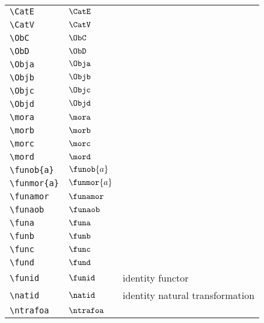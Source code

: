 \begin{longtable}{lll}
 {\color[rgb]{0.5,0.5,0.5}\texttt{\textbackslash CatE}} & $\CatE$ & \\ 
 {\color[rgb]{0.5,0.5,0.5}\texttt{\textbackslash CatV}} & $\CatV$ & \\ 
 {\color[rgb]{0.5,0.5,0.5}\texttt{\textbackslash ObC}} & $\ObC$ & \\ 
 {\color[rgb]{0.5,0.5,0.5}\texttt{\textbackslash ObD}} & $\ObD$ & \\ 
 {\color[rgb]{0.5,0.5,0.5}\texttt{\textbackslash Obja}} & $\Obja$ & \\ 
 {\color[rgb]{0.5,0.5,0.5}\texttt{\textbackslash Objb}} & $\Objb$ & \\ 
 {\color[rgb]{0.5,0.5,0.5}\texttt{\textbackslash Objc}} & $\Objc$ & \\ 
 {\color[rgb]{0.5,0.5,0.5}\texttt{\textbackslash Objd}} & $\Objd$ & \\ 
 {\color[rgb]{0.5,0.5,0.5}\texttt{\textbackslash mora}} & $\mora$ & \\ 
 {\color[rgb]{0.5,0.5,0.5}\texttt{\textbackslash morb}} & $\morb$ & \\ 
 {\color[rgb]{0.5,0.5,0.5}\texttt{\textbackslash morc}} & $\morc$ & \\ 
 {\color[rgb]{0.5,0.5,0.5}\texttt{\textbackslash mord}} & $\mord$ & \\ 
 {\color[rgb]{0.5,0.5,0.5}\texttt{\textbackslash funob\{a\}}} & $\funob{a}$ & \\ 
 {\color[rgb]{0.5,0.5,0.5}\texttt{\textbackslash funmor\{a\}}} & $\funmor{a}$ & \\ 
 {\color[rgb]{0.5,0.5,0.5}\texttt{\textbackslash funamor}} & $\funamor$ & \\ 
 {\color[rgb]{0.5,0.5,0.5}\texttt{\textbackslash funaob}} & $\funaob$ & \\ 
 {\color[rgb]{0.5,0.5,0.5}\texttt{\textbackslash funa}} & $\funa$ & \\ 
 {\color[rgb]{0.5,0.5,0.5}\texttt{\textbackslash funb}} & $\funb$ & \\ 
 {\color[rgb]{0.5,0.5,0.5}\texttt{\textbackslash func}} & $\func$ & \\ 
 {\color[rgb]{0.5,0.5,0.5}\texttt{\textbackslash fund}} & $\fund$ & \\ 
 {\color[rgb]{0.5,0.5,0.5}\texttt{\textbackslash funid}} & $\funid$ &  identity functor\\ 
 {\color[rgb]{0.5,0.5,0.5}\texttt{\textbackslash natid}} & $\natid$ &  identity natural transformation\\ 
 {\color[rgb]{0.5,0.5,0.5}\texttt{\textbackslash ntrafoa}} & $\ntrafoa$ & \\ 

\end{longtable}
